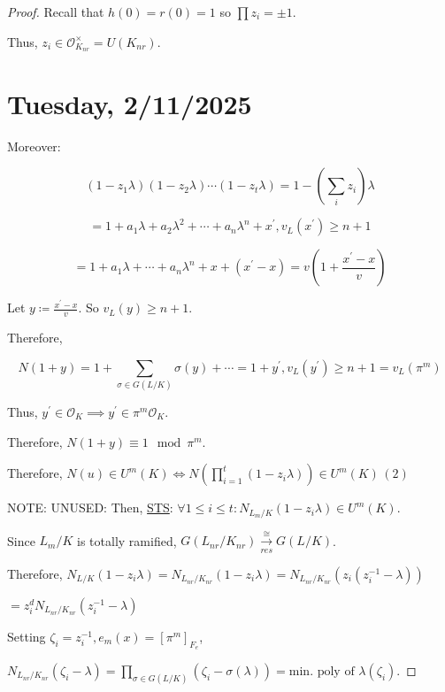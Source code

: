 \documentclass{article}
\theoremstyle{definition}
\numberwithin{theorem}{subsection}
\begin{document}
\begin{proof}
        Recall that \(h(0)=r(0)=1\) so \(\prod z_i = \pm 1\).
        
        Thus, \(z_i \in \mathcal{O}_{K_{nr}}^\times = U(K_{nr})\).
    
        \section*{Tuesday, 2/11/2025}
        
        Moreover:

        \[
            (1 - z_1 \lambda)(1- z_2 \lambda) \cdots (1-z_t \lambda) = 1 - \left( \sum_{i} z_i \right) \lambda
        \]

        \[
            = 1 + a_1 \lambda + a_2 \lambda^2 + \cdots + a_n \lambda^n + x^{\prime}, v_L(x^{\prime}) \geq n+1
        \]

        \[
            = 1 + a_1 \lambda + \cdots + a_n \lambda^n + x + (x^{\prime} - x) = v \left( 1 + \frac{x^{\prime} - x}{v} \right) 
        \]


        Let \(y\coloneqq \frac{x^{\prime} - x}{v}\). So \(v_L(y) \geq n + 1\).

        Therefore,

        \[
            N(1 + y) = 1 + \sum_{\sigma \in G(L / K)} \sigma (y) + \cdots = 1 + y^{\prime}, v_L (y^{\prime}) \geq n + 1 = v_L(\pi^m)
        \]

        Thus, \(y^{\prime} \in \mathcal{O}_K \implies y^{\prime} \in \pi^m \mathcal{O}_K\).

        Therefore, \(N(1+y) \equiv 1 \mod \pi^m\).

        Therefore, \(N(u) \in U^m(K) \iff N \left( \prod_{i=1}^{t} (1 - z_i \lambda) \right) \in U^m(K)\,(2)\)
        
        NOTE: UNUSED: Then, \underline{STS}: \(\forall 1 \leq i \leq t: N_{L_m / K}(1-z_i \lambda) \in U^m(K)\).

        Since \(L_m / K\) is totally ramified, \(G(L_{nr} / K_{nr}) \xrightarrow[res]{\cong} G(L / K)\).

        Therefore, \(N_{L / K}(1 - z_i \lambda) = N_{L_{nr} / K_{nr}}(1 - z_i \lambda) = N_{L_{nr} / K_{nr}} (z_i (z_i ^{-1} -  \lambda))\)
        
        \(= z_i^d N_{L_{nr} / K_{nr}}(z_i ^{-1} - \lambda)\)

        Setting \(\zeta_i = z_i ^{-1}, e_m(x) = [\pi^m]_{F_e}\), 

        \(N_{L_{nr} / K_{nr}}(\zeta_i - \lambda)= \prod_{\sigma \in G(L / K)}(\zeta_i - \sigma(\lambda))=\text{min. poly of } \lambda(\zeta_i)\).
        

\end{proof}
\end{document}
